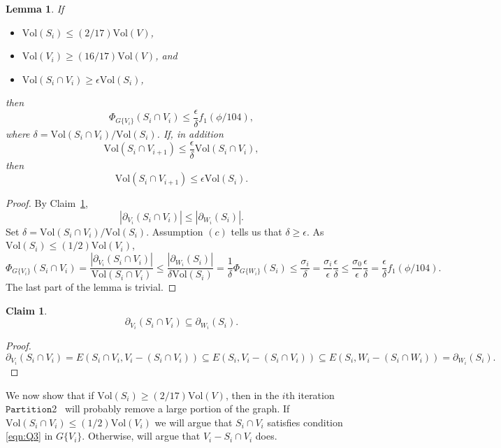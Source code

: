 \documentclass[11pt]{article}
\newtheorem{lemma}[theorem]{Lemma}
\newtheorem{claim}[theorem]{Claim}
\newcommand{\partition}{\ensuremath{\mathtt{Partition}}}
\def\bdry#1#2{\partial_{#1}\left(#2\right)}
\def\intersect{\cap}
\def\sizeof#1{\left|#1  \right|}
\def\intersect{\cap}
\def\vol#1{\mathrm{Vol}\left(#1  \right)}
\def\conduc#1#2{\Phi_{#1}\left(#2  \right)}
\begin{document}
\begin{lemma}\label{lem:ac4}
If
\begin{itemize}
\item [(a)] $\vol{S_{i}} \leq (2/17) \vol{V}$, 
\item [(b)] $\vol{V_{i}} \geq (16/17) \vol{V}$, and
\item [(c)] $\vol{S_{i} \intersect V_{i}} \geq \epsilon \vol{S_{i}}$,
\end{itemize}
then
\[
  \conduc{G \{V_{i} \} }{S_{i} \intersect V_{i}} 
  \leq \frac{\epsilon}{\delta} f_{1} (\phi/104),
\]
where $\delta = \vol{S_{i} \intersect V_{i}} / \vol{S_{i}}$.
If, in addition 
\[
\vol{S_{i} \intersect V_{i+1}} 
  \leq \frac{\epsilon}{\delta } \vol{S_{i} \intersect V_{i}},
\]
then
\[
\vol{S_{i} \intersect V_{i+1}} \leq \epsilon \vol{S_{i}}.
\]
\end{lemma}
\begin{proof}
By Claim~\ref{clm:ac0},
\[
  \sizeof{\bdry{V_{i}}{S_{i} \intersect V_{i}}}
\leq 
  \sizeof{\bdry{W_{i}}{S_{i}}}.
\]
Set $\delta  = \vol{S_{i} \intersect V_{i}} / \vol{S_{i}}$.
Assumption $(c)$ tells us that $\delta \geq \epsilon$.
As $\vol{S_{i}} \leq (1/2) \vol{V_{i}}$, 
\[
  \conduc{G \{V_{i} \}}{S_{i} \intersect V_{i}}
=
\frac{
  \sizeof{\bdry{V_{i}}{S_{i} \intersect V_{i}}}
}{
  \vol{S_{i} \intersect V_{i}}
}
\leq 
\frac{
  \sizeof{ \bdry{W_{i}}{S_{i}} }
}{
  \delta \vol{S_{i}}
}
=
\frac{1}{\delta}
\conduc{G \{W_{i} \}}{S_{i}}
\leq 
  \frac{\sigma_{i}}{\delta}
=
  \frac{\sigma_{i}}{\epsilon}
  \frac{\epsilon}{ \delta }
\leq 
  \frac{\sigma_{0}}{\epsilon}
  \frac{\epsilon}{ \delta }
=
  \frac{\epsilon}{\delta} f_{1} (\phi /104).
\]
The last part of the lemma is trivial.
\end{proof}

\begin{claim}\label{clm:ac0}
\[
  \bdry{V_{i}}{S_{i} \intersect V_{i}}
\subseteq 
  \bdry{W_{i}}{S_{i}}.
\]
\end{claim}
\begin{proof}
\[
  \bdry{V_{i}}{S_{i} \intersect V_{i}}
=
 E (S_{i} \intersect V_{i}, V_{i} - (S_{i} \intersect V_{i}))
\subseteq 
 E (S_{i} , V_{i} - (S_{i} \intersect V_{i}))
\subseteq 
 E (S_{i} , W_{i} - (S_{i} \intersect W_{i}))
=
  \bdry{W_{i}}{S_{i}}.
\]
\end{proof}

We now show that if $\vol{S_{i}} \geq (2/17) \vol{V}$,
  then in the $i$th iteration \partition2 \ will probably
  remove a large portion of the graph.
If $\vol{S_{i} \intersect V_{i}} \leq (1/2) \vol{V_{i}}$
  we will argue that $S_{i} \intersect V_{i}$ satisfies condition
  \eqref{eqn:Q3} in $G \{V_{i}  \}$.
Otherwise, will argue that $V_{i} - S_{i} \intersect V_{i}$ does.
\end{document}
